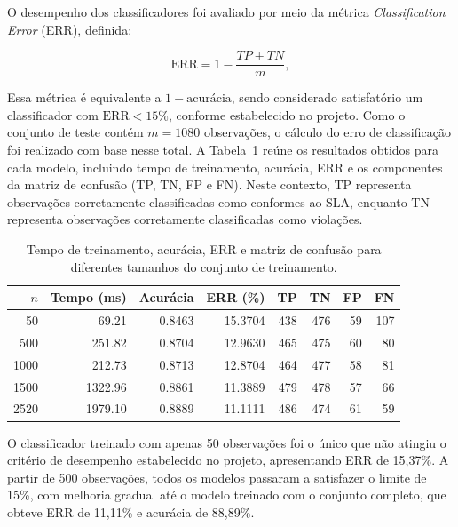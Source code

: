 \documentclass[11pt,a4paper]{article}
\begin{document}
O desempenho dos classificadores foi avaliado por meio da métrica \emph{Classification Error} (ERR), definida:

\begin{equation}
\mathrm{ERR} = 1 - \frac{TP + TN}{m},
\label{eq:err}
\end{equation}

Essa métrica é equivalente a $1-\text{acurácia}$, sendo considerado satisfatório um classificador com $\mathrm{ERR}<15\%$, conforme estabelecido no projeto. Como o conjunto de teste contém $m=1080$ observações, o cálculo do erro de classificação foi realizado com base nesse total. A Tabela~\ref{tab:err_time} reúne os resultados obtidos para cada modelo, incluindo tempo de treinamento, acurácia, ERR e os componentes da matriz de confusão (TP, TN, FP e FN). Neste contexto, TP representa observações corretamente classificadas como conformes ao SLA, enquanto TN representa observações corretamente classificadas como violações.


\begin{table}[H]
\centering
\caption{Tempo de treinamento, acurácia, ERR e matriz de confusão para diferentes tamanhos do conjunto de treinamento.}
\label{tab:err_time}
\scriptsize
\setlength{\tabcolsep}{4pt}
\begin{tabular}{rrrrrrrr}
\toprule
\textbf{$n$} & \textbf{Tempo (ms)} & \textbf{Acurácia} & \textbf{ERR (\%)} & \textbf{TP} & \textbf{TN} & \textbf{FP} & \textbf{FN} \\
\midrule
50   & 69.21   & 0.8463 & 15.3704 & 438 & 476 & 59 & 107 \\
500  & 251.82  & 0.8704 & 12.9630 & 465 & 475 & 60 & 80 \\
1000 & 212.73  & 0.8713 & 12.8704 & 464 & 477 & 58 & 81 \\
1500 & 1322.96 & 0.8861 & 11.3889 & 479 & 478 & 57 & 66 \\
2520 & 1979.10 & 0.8889 & 11.1111 & 486 & 474 & 61 & 59 \\
\bottomrule
\end{tabular}
\end{table}

O classificador treinado com apenas 50 observações foi o único que não atingiu o critério de desempenho estabelecido no projeto, apresentando ERR de 15{,}37\%. A partir de 500 observações, todos os modelos passaram a satisfazer o limite de 15\%, com melhoria gradual até o modelo treinado com o conjunto completo, que obteve ERR de 11{,}11\% e acurácia de 88{,}89\%.
\end{document}
